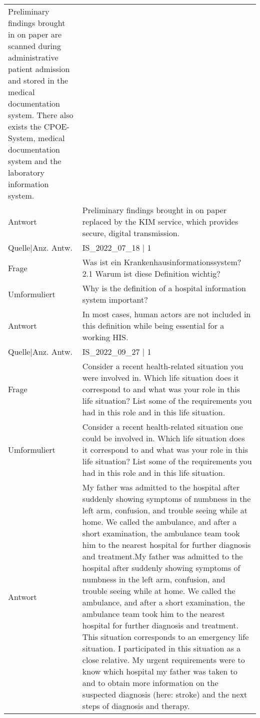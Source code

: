 {\begin{landscape}
\begin{longtable}{p{3cm}p{}}
    Preliminary findings brought in on paper are scanned during administrative patient admission and stored in the medical documentation system.
    There also exists the CPOE-System, medical documentation system and the laboratory information system.\\
    Antwort & Preliminary findings brought in on paper replaced by the KIM service, which provides secure, digital transmission.\\
    Quelle|Anz. Antw. &  IS\_2022\_07\_18  | 1 \\
    \midrule
    Frage & Was ist ein Krankenhausinformationssystem?
            2.1 Warum ist diese Definition wichtig? \\
    Umformuliert & Why is the definition of a hospital information system important? \\
    Antwort & In most cases, human actors are not included in this definition while being essential for a working HIS.\\
    Quelle|Anz. Antw. &  IS\_2022\_09\_27  | 1 \\
    \midrule
    Frage & Consider a recent health-related situation you were involved in.
    Which life situation does it correspond to and what was your role in this life situation? List some of the requirements you had in this role and in this life situation.\\
    Umformuliert & Consider a recent health-related situation one could be involved in.
    Which life situation does it correspond to and what was your role in this life situation? List some of the requirements you had in this role and in this life situation.\\
    Antwort & My father was admitted to the hospital after suddenly showing symptoms of numbness in the left arm, confusion, and trouble seeing while at home.
    We called the ambulance, and after a short examination, the ambulance team took him to the nearest hospital for further diagnosis and treatment.My father was admitted to the hospital after suddenly showing symptoms of numbness in the left arm, confusion, and trouble seeing while at home.
    We called the ambulance, and after a short examination, the ambulance team took him to the nearest hospital for further diagnosis and treatment.
    This situation corresponds to an emergency life situation. I participated in this situation as a close relative.
    My urgent requirements were to know which hospital my father was taken to and to obtain more information on the suspected diagnosis (here: stroke) and the next steps of diagnosis and therapy.\\

\end{longtable}
\end{landscape}}
